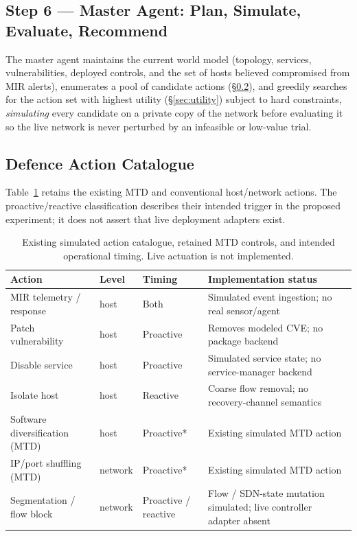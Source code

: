 \documentclass[conference]{IEEEtran}
\begin{document}
\subsection{Step 6 --- Master Agent: Plan, Simulate, Evaluate, Recommend}
\label{sec:master}

The master agent maintains the current world model (topology, services,
vulnerabilities, deployed controls, and the set of hosts believed compromised from
MIR alerts), enumerates a pool of candidate actions
(\S\ref{sec:actions}), and greedily searches for the action set with highest utility
(\S\ref{sec:utility}) subject to hard constraints, \emph{simulating} every candidate
on a private copy of the network before evaluating it so the live network is never
perturbed by an infeasible or low-value trial.

\subsection{Defence Action Catalogue}
\label{sec:actions}

Table~\ref{tab:actions} retains the existing MTD and conventional host/network
actions. The proactive/reactive classification describes their intended trigger in
the proposed experiment; it does not assert that live deployment adapters exist.

\begin{table}[t]
\centering
\small
\setlength{\tabcolsep}{2pt}
\caption{Existing simulated action catalogue, retained MTD controls, and intended
operational timing. Live actuation is not implemented.}
\label{tab:actions}
\begin{tabular}{@{}p{}p{}p{}p{}@{}}
\toprule
Action & Level & Timing & Implementation status \\
\midrule
MIR telemetry / response & host & Both & Simulated event ingestion; no real sensor/agent \\
Patch vulnerability & host & Proactive & Removes modeled CVE; no package backend \\
Disable service & host & Proactive & Simulated service state; no service-manager backend \\
Isolate host & host & Reactive & Coarse flow removal; no recovery-channel semantics \\
Software diversification (MTD) & host & Proactive* & Existing simulated MTD action \\
IP/port shuffling (MTD) & network & Proactive* & Existing simulated MTD action \\
Segmentation / flow block & network & Proactive / reactive & Flow / SDN-state mutation simulated; live controller adapter absent \\
\bottomrule
\end{tabular}
\end{table}
\end{document}
